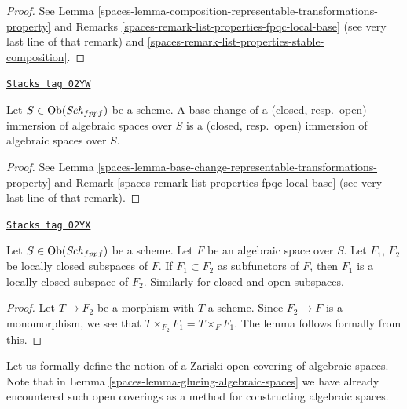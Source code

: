 \begin{proof}

See Lemma \ref{spaces-lemma-composition-representable-transformations-property} and
Remarks \ref{spaces-remark-list-properties-fpqc-local-base} (see very last line of
that remark) and \ref{spaces-remark-list-properties-stable-composition}.
\end{proof}

\begin{lemma}
\label{spaces-lemma-base-change-immersions}
\href{https://stacks.math.columbia.edu/tag/02YW}{\texttt{Stacks tag 02YW}}

Let $S \in \operatorname{Ob}(\mathit{Sch}_{fppf})$ be a scheme.
A base change of a (closed, resp.\ open) immersion
of algebraic spaces over $S$ is a (closed, resp.\ open)
immersion of algebraic spaces over $S$.
\end{lemma}

\begin{proof}

See Lemma \ref{spaces-lemma-base-change-representable-transformations-property} and
Remark \ref{spaces-remark-list-properties-fpqc-local-base} (see very last line of
that remark).
\end{proof}

\begin{lemma}
\label{spaces-lemma-sub-subspaces}
\href{https://stacks.math.columbia.edu/tag/02YX}{\texttt{Stacks tag 02YX}}

Let $S \in \operatorname{Ob}(\mathit{Sch}_{fppf})$ be a scheme.
Let $F$ be an algebraic space over $S$. Let $F_1$, $F_2$ be
locally closed subspaces of $F$. If $F_1 \subset F_2$ as subfunctors
of $F$, then $F_1$ is a locally closed subspace of $F_2$.
Similarly for closed and open subspaces.
\end{lemma}

\begin{proof}
Let $T \to F_2$ be a morphism with $T$ a scheme.
Since $F_2 \to F$ is a monomorphism, we see that
$T \times_{F_2} F_1 = T \times_F F_1$. The lemma follows
formally from this.
\end{proof}

Let us formally define the notion of a Zariski open covering of
algebraic spaces. Note that in Lemma \ref{spaces-lemma-glueing-algebraic-spaces}
we have already encountered such open coverings as a method for
constructing algebraic spaces.

